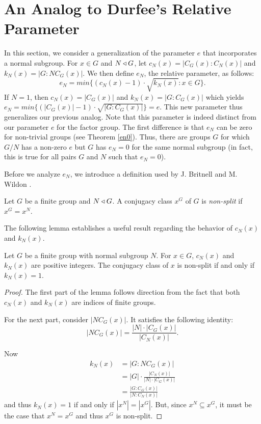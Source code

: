 \documentclass[main.tex]{subfiles}
\begin{document}
\chapter{An Analog to Durfee's Relative Parameter}

In this section, we consider a generalization of the parameter $e$ that incorporates a normal subgroup. For $x \in G$ and $N \triangleleft G$, let $c_N(x) = |C_G(x):C_N(x)|$ and $k_N(x) = |G:NC_G(x)|$. We then define $e_N$, the relative parameter, as follows:
$$e_N = min\{(c_N(x) - 1) \cdot \sqrt{k_N(x)} : x \in G\}\text{.}$$
If $N=1$, then $c_N(x) = |C_G(x)|$ and $k_N(x) = |G:C_G(x)|$ which yields $e_N = min\{(|C_G(x)| - 1)\cdot\sqrt{|G:C_G(x)|}\} = e$. This new parameter thus generalizes our previous analog. Note that this parameter is indeed distinct from our parameter $e$ for the factor group. The first difference is that $e_N$ can be zero for non-trivial groups (see Theorem \ref{en0}). Thus, there are groups $G$ for which $G/N$ has a non-zero $e$ but $G$ has $e_N = 0$ for the same normal subgroup (in fact, this is true for all pairs $G$ and $N$ such that $e_N = 0$).



 Before we analyze $e_N$, we introduce a definition used by J. Britnell and M. Wildon \cite{britnellwildonarticle}.

\hss

\begin{definition}
Let $G$ be a finite group and $N \triangleleft G$. A conjugacy class $x^G$ of $G$ is \emph{non-split} \cite{britnellwildonarticle} if $x^G = x^N$.
\end{definition}

\hss

The following lemma establishes a useful result regarding the behavior of $c_N(x)$ and $k_N(x)$.

\begin{lemma}\label{kn1}
Let $G$ be a finite group with normal subgroup $N$. For $x \in G$, $c_N(x)$ and $k_N(x)$ are positive integers. The conjugacy class of $x$ is non-split if and only if $k_N(x) = 1$.
\end{lemma}

\begin{proof}
The first part of the lemma follows direction from the fact that both $c_N(x)$ and $k_N(x)$ are indices of finite groups.

For the next part, consider $|NC_G(x)|$. It satisfies the following identity:
$$|NC_G(x)| = \frac{|N| \cdot |C_G(x)|}{|C_N(x)|}\text{.}$$

Now
\begin{align*}
k_N(x) &= |G : NC_G(x)| \\
&= |G| \cdot \frac{|C_N(x)|}{|N| \cdot |C_G(x)|} \\
&= \frac{|G : C_G(x)|}{|N : C_N(x)|}
\end{align*}
and thus $k_N(x) = 1$ if and only if $|x^N| = |x^G|$. But, since $x^N \subseteq x^G$, it must be the case that $x^N = x^G$ and thus $x^G$ is non-split.
\end{proof}
\end{document}
